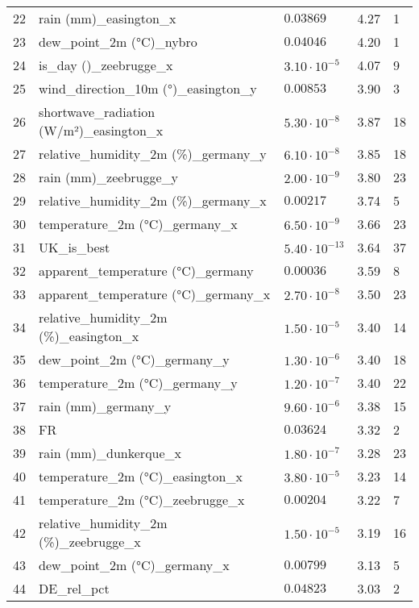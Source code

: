 \begin{table}[H]
\begin{tabular}{r l l l l}
        22 & rain (mm)\_easington\_x & $0.03869$ & 4.27 & 1 \\
        23 & dew\_point\_2m (°C)\_nybro & $0.04046$ & 4.20 & 1 \\
        24 & is\_day ()\_zeebrugge\_x & $3.10 \cdot 10^{-5}$ & 4.07 & 9 \\
        25 & wind\_direction\_10m (°)\_easington\_y & $0.00853$ & 3.90 & 3 \\
        26 & shortwave\_radiation (W/m²)\_easington\_x & $5.30 \cdot 10^{-8}$ & 3.87 & 18 \\
        27 & relative\_humidity\_2m (\%)\_germany\_y & $6.10 \cdot 10^{-8}$ & 3.85 & 18 \\
        28 & rain (mm)\_zeebrugge\_y & $2.00 \cdot 10^{-9}$ & 3.80 & 23 \\
        29 & relative\_humidity\_2m (\%)\_germany\_x & $0.00217$ & 3.74 & 5 \\
        30 & temperature\_2m (°C)\_germany\_x & $6.50 \cdot 10^{-9}$ & 3.66 & 23 \\
        31 & UK\_is\_best & $5.40 \cdot 10^{-13}$ & 3.64 & 37 \\
        32 & apparent\_temperature (°C)\_germany & $0.00036$ & 3.59 & 8 \\
        33 & apparent\_temperature (°C)\_germany\_x & $2.70 \cdot 10^{-8}$ & 3.50 & 23 \\
        34 & relative\_humidity\_2m (\%)\_easington\_x & $1.50 \cdot 10^{-5}$ & 3.40 & 14 \\
        35 & dew\_point\_2m (°C)\_germany\_y & $1.30 \cdot 10^{-6}$ & 3.40 & 18 \\
        36 & temperature\_2m (°C)\_germany\_y & $1.20 \cdot 10^{-7}$ & 3.40 & 22 \\
        37 & rain (mm)\_germany\_y & $9.60 \cdot 10^{-6}$ & 3.38 & 15 \\
        38 & FR & $0.03624$ & 3.32 & 2 \\
        39 & rain (mm)\_dunkerque\_x & $1.80 \cdot 10^{-7}$ & 3.28 & 23 \\
        40 & temperature\_2m (°C)\_easington\_x & $3.80 \cdot 10^{-5}$ & 3.23 & 14 \\
        41 & temperature\_2m (°C)\_zeebrugge\_x & $0.00204$ & 3.22 & 7 \\
        42 & relative\_humidity\_2m (\%)\_zeebrugge\_x & $1.50 \cdot 10^{-5}$ & 3.19 & 16 \\
        43 & dew\_point\_2m (°C)\_germany\_x & $0.00799$ & 3.13 & 5 \\
        44 & DE\_rel\_pct & $0.04823$ & 3.03 & 2 \\

\end{tabular}
\end{table}

